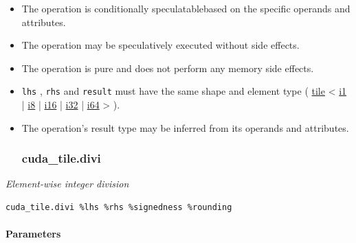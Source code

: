 \documentclass{article}
\begin{document}
\begin{itemize}
\item The operation is conditionally speculatablebased on the specific operands and attributes.
\item The operation may be speculatively executed without side effects.
\item The operation is pure and does not perform any memory side effects.
\item \texttt{lhs} , \texttt{rhs} and \texttt{result} must have the same shape and element type ( \href{https://docs.nvidia.com/cuda/tile-ir/latest/sections/types.html#type-tile}{tile} < \href{https://docs.nvidia.com/cuda/tile-ir/latest/sections/types.html#subsection-element-types}{i1} | \href{https://docs.nvidia.com/cuda/tile-ir/latest/sections/types.html#subsection-element-types}{i8} | \href{https://docs.nvidia.com/cuda/tile-ir/latest/sections/types.html#subsection-element-types}{i16} | \href{https://docs.nvidia.com/cuda/tile-ir/latest/sections/types.html#subsection-element-types}{i32} | \href{https://docs.nvidia.com/cuda/tile-ir/latest/sections/types.html#subsection-element-types}{i64} > ).
\item The operation's result type may be inferred from its operands and attributes.


\subsubsection{cuda\_tile.divi}

\end{itemize}
\textit{Element-wise integer division}


\begin{lstlisting}
cuda_tile.divi %lhs %rhs %signedness %rounding
\end{lstlisting}

\paragraph{Parameters}
\end{document}
